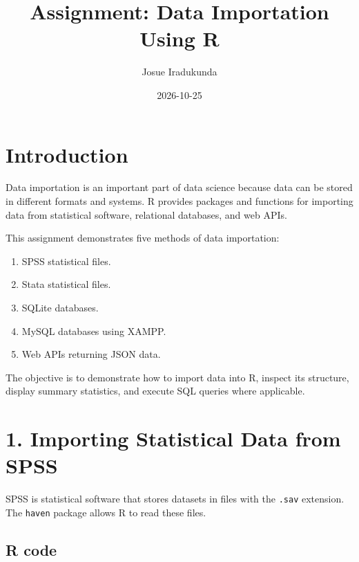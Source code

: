 \documentclass[
]{article}
\title{Assignment: Data Importation Using R}
\author{Josue Iradukunda}
\date{2026-10-25}
\providecommand{\tightlist}{%
  \setlength{\itemsep}{0pt}\setlength{\parskip}{0pt}}
\begin{document}
\maketitle

{
\setcounter{tocdepth}{2}
\tableofcontents
}
\section{Introduction}\label{introduction}

Data importation is an important part of data science because data can
be stored in different formats and systems. R provides packages and
functions for importing data from statistical software, relational
databases, and web APIs.

This assignment demonstrates five methods of data importation:

\begin{enumerate}
\def\labelenumi{\arabic{enumi}.}
\tightlist
\item
  SPSS statistical files.
\item
  Stata statistical files.
\item
  SQLite databases.
\item
  MySQL databases using XAMPP.
\item
  Web APIs returning JSON data.
\end{enumerate}

The objective is to demonstrate how to import data into R, inspect its
structure, display summary statistics, and execute SQL queries where
applicable.

\section{1. Importing Statistical Data from
SPSS}\label{importing-statistical-data-from-spss}

SPSS is statistical software that stores datasets in files with the
\texttt{.sav} extension. The \texttt{haven} package allows R to read
these files.

\subsection{R code}\label{r-code}
\end{document}
